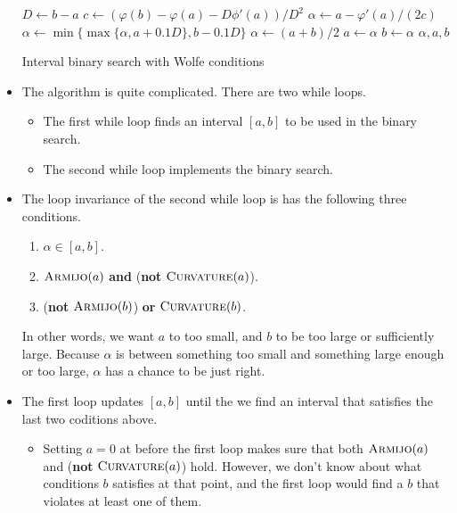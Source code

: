 \documentclass[10pt]{article}
\begin{document}
\begin{itemize}
\begin{algorithm}[t]
\begin{algorithmic}
                \State $D \gets b - a$
                \State $c \gets (\varphi(b) - \varphi(a) - D \phi'(a)) / D^2$
                    \State $\alpha \gets a - \varphi'(a) / (2c)$
                    \State $\alpha \gets \min\{ \max\{ \alpha, a + 0.1D\}, b - 0.1D \}$
                \Else
                    \State $\alpha \gets (a+b) / 2$
                \EndIf
                    \State $a \gets \alpha$
                \Else
                    \State $b \gets \alpha$                    
                \EndIf
                \State \Return $\alpha, a, b$
            \EndProcedure
        \end{algorithmic}
        \caption{Interval binary search with Wolfe conditions}
        \label{algo:interval-binary-search-with-wolfe-conditions}
    \end{algorithm}

    \item The algorithm is quite complicated. There are two while loops.
    \begin{itemize}
        \item The first while loop finds an interval $[a,b]$ to be used in the binary search.
        \item The second while loop implements the binary search.
    \end{itemize}

    \item The loop invariance of the second while loop is has the following three conditions.
    \begin{enumerate}
        \item $\alpha \in [a,b]$.
        \item $\Call{Armijo}{a}$ {\bf and} ({\bf not} $\Call{Curvature}{a}$).
        \item ({\bf not} $\Call{Armijo}{b}$) {\bf or} $\Call{Curvature}{b}$.
    \end{enumerate}
    In other words, we want $a$ to too small, and $b$ to be too large or sufficiently large. Because $\alpha$ is between something too small and something large enough or too large, $\alpha$ has a chance to be just right.
    
    \item The first loop updates $[a,b]$ until the we find an interval that satisfies the last two coditions above.
    
    \begin{itemize}
        \item Setting $a = 0$ at before the first loop makes sure that both $\Call{Armijo}{a}$ and ({\bf not} $\Call{Curvature}{a}$) hold. However, we don't know about what conditions $b$ satisfies at that point, and the first loop would find a $b$ that violates at least one of them.
    

\end{itemize}
\end{itemize}
\end{document}
